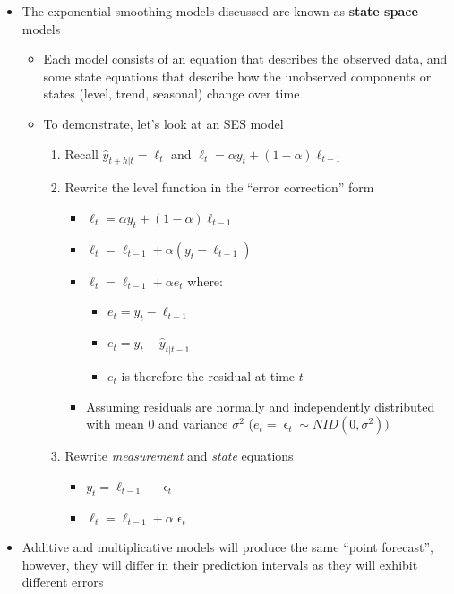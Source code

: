 \documentclass{article}\usepackage[]{graphicx}\usepackage[]{color}
\begin{document}
\begin{itemize}
    \item The exponential smoothing models discussed are known as \textbf{state space} models
    \begin{itemize}
        \item Each model consists of an equation that describes the observed data, and some state equations that describe how the unobserved components or states (level, trend, seasonal) change over time
        \item To demonstrate, let's look at an SES model
        \begin{enumerate}
            \item Recall $\hat{y}_{t+h|t} = \ell_t$ and $\ell_t = \alpha y_t + (1-\alpha)\ell_{t-1}$
            \item Rewrite the level function in the ``error correction'' form
            \begin{itemize}
                \item $\ell_t = \alpha y_t + (1-\alpha)\ell_{t-1}$
                \item $\ell_t = \ell_{t-1} + \alpha(y_t - \ell_{t-1})$
                \item $\ell_t = \ell_{t-1} + \alpha e_t$ where:
                \begin{itemize}
                    \item $e_t = y_t - \ell_{t-1}$
                    \item $e_t = y_t - \hat{y}_{t|t-1}$
                    \item $e_t$ is therefore the residual at time $t$
                \end{itemize}
                \item Assuming residuals are normally and independently distributed with mean 0 and variance $\sigma^2$ ($e_t = \upvarepsilon_t \sim NID(0, \sigma^2))$
            \end{itemize}
            \item Rewrite \textit{measurement} and \textit{state} equations
            \begin{itemize}
                \item $y_t = \ell_{t-1} - \upvarepsilon_t$
                \item $\ell_t = \ell_{t-1} + \alpha \upvarepsilon_t$
            \end{itemize}
        \end{enumerate}
    \end{itemize}
    \item Additive and multiplicative models will produce the same ``point forecast'', however, they will differ in their prediction intervals as they will exhibit different errors

\end{itemize}
\end{document}
